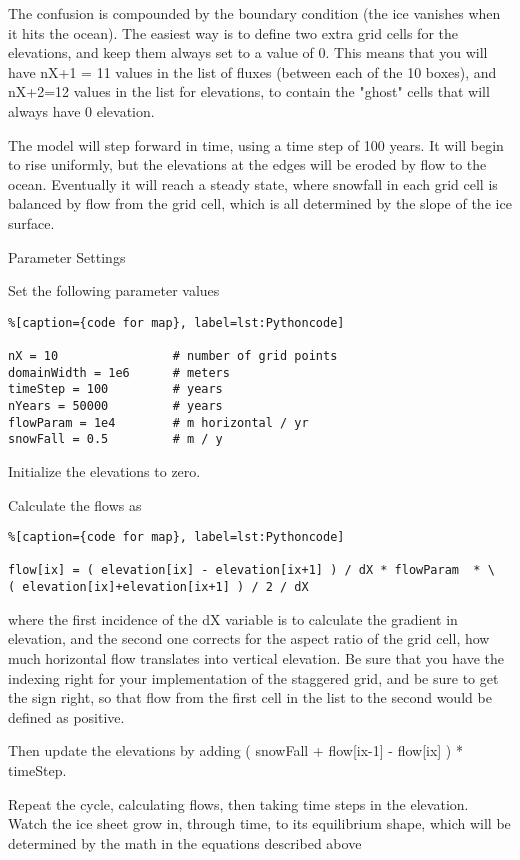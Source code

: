 The confusion is compounded by the boundary condition (the ice vanishes when it hits the ocean). The easiest way is to define two extra grid cells for the elevations, and keep them always set to a value of 0. This means that you will have nX+1 = 11 values in the list of fluxes (between each of the 10 boxes), and nX+2=12 values in the list for elevations, to contain the "ghost" cells that will always have 0 elevation.

The model will step forward in time, using a time step of 100 years. It will begin to rise uniformly, but the elevations at the edges will be eroded by flow to the ocean. Eventually it will reach a steady state, where snowfall in each grid cell is balanced by flow from the grid cell, which is all determined by the slope of the ice surface.

Parameter Settings

Set the following parameter values

\begin{lstlisting}%[caption={code for map}, label=lst:Pythoncode]

nX = 10                # number of grid points
domainWidth = 1e6      # meters
timeStep = 100         # years
nYears = 50000         # years
flowParam = 1e4        # m horizontal / yr
snowFall = 0.5         # m / y
\end{lstlisting}

Initialize the elevations to zero.

Calculate the flows as

\begin{lstlisting}%[caption={code for map}, label=lst:Pythoncode]

flow[ix] = ( elevation[ix] - elevation[ix+1] ) / dX * flowParam  * \
( elevation[ix]+elevation[ix+1] ) / 2 / dX
\end{lstlisting}

where the first incidence of the dX variable is to calculate the gradient in elevation, and the second one corrects for the aspect ratio of the grid cell, how much horizontal flow translates into vertical elevation. Be sure that you have the indexing right for your implementation of the staggered grid, and be sure to get the sign right, so that flow from the first cell in the list to the second would be defined as positive.

Then update the elevations by adding ( snowFall + flow[ix-1] - flow[ix] ) * timeStep.

Repeat the cycle, calculating flows, then taking time steps in the elevation. Watch the ice sheet grow in, through time, to its equilibrium shape, which will be determined by the math in the equations described above

